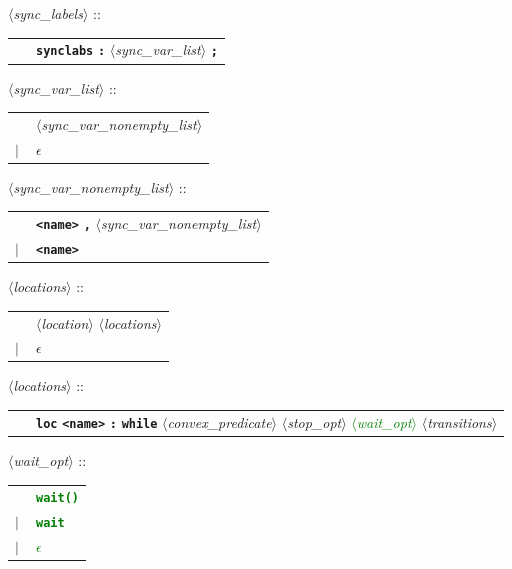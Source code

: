 \documentclass[a4paper,11pt]{article}
\newcommand{\emptystring}{$\epsilon$}
\newcommand{\nt}[1]{$\langle$\emph{#1}$\rangle$}
\newcommand{\regleGrammaire}[1]{\bigskip \noindent \nt{#1} :: \\}
\newcommand{\npec}[1]{\textcolor{green}{#1}}
\newcommand{\code}[1]{\textbf{\texttt{#1}}}
\begin{document}
\regleGrammaire{sync\_labels}
\begin{tabular}{l l}
	\  & \code{synclabs} \code{:} \nt{sync\_var\_list} \code{;} \\
\end{tabular}

\regleGrammaire{sync\_var\_list}
\begin{tabular}{l l}
	\  & \nt{sync\_var\_nonempty\_list} \\
	$|$ & \emptystring \\
\end{tabular}

\regleGrammaire{sync\_var\_nonempty\_list}
\begin{tabular}{l l}
	\  & \code{<name>} \code{,} \nt{sync\_var\_nonempty\_list} \\
	$|$ & \code{<name>} \\
\end{tabular}

\regleGrammaire{locations}
\begin{tabular}{l l}
	\  & \nt{location} \nt{locations} \\
	$|$ & \emptystring \\
\end{tabular}

\regleGrammaire{locations}
\begin{tabular}{l l}
	\  & \code{loc} \code{<name>} \code{:} \code{while} \nt{convex\_predicate} \nt{stop\_opt} \npec{\nt{wait\_opt}} \nt{transitions} \\
\end{tabular}

\regleGrammaire{wait\_opt}
\begin{tabular}{l l}
	\ & \npec{\code{wait()}} \\
	$|$ & \npec{\code{wait}} \\
	$|$ & \npec{\emptystring} \\
\end{tabular}
\end{document}
